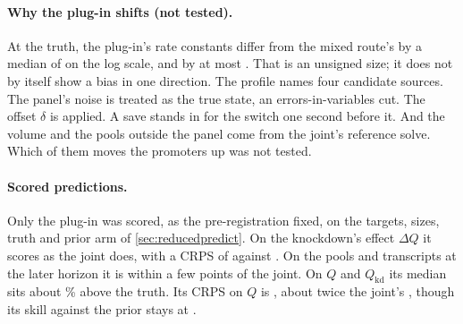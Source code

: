 \paragraph{Why the plug-in shifts (not tested).} At the truth, the plug-in's rate constants
differ from the mixed route's by a median of  on the log scale, and
by at most . That is an unsigned size; it does not by itself show a bias
in one direction. The profile names four candidate sources. The panel's noise is treated as the true
state, an errors-in-variables cut. The offset $\delta$ is applied. A save stands in for the
switch one second before it. And the volume and the pools outside the panel come from the
joint's reference solve. Which of them moves the promoters up was not tested.

\paragraph{Scored predictions.} Only the plug-in was scored, as the pre-registration fixed,
on the targets, sizes, truth and prior arm of \cref{sec:reducedpredict}. On the knockdown's
effect $\Delta Q$ it scores as the joint does, with a CRPS of  against
. On the pools and transcripts at the later horizon it is within a few
points of the joint. On $Q$ and $Q_{\mathrm{kd}}$ its median sits about
\% above the truth. Its CRPS on $Q$ is , about
twice the joint's , though its skill against the prior stays at
.
